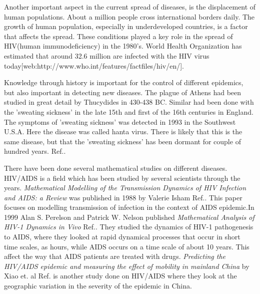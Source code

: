 \documentclass[%
twoside,                 %
final,                   %
chapterprefix=true,      %
open=right               %
10pt]{book}
\begin{document}
\vspace{3mm}




\vspace{3mm}


Another important aspect in the current spread of diseases, is the displacement of human populations. About a million people cross international borders daily. The growth of human population, especially in underdeveloped countries, is a factor that affects the spread. These conditions played a key role in the spread of HIV(human immunodeficiency) in the 1980's. World Health Organization has estimated that around 32.6 million are infected with the HIV virus today[web:http://www.who.int/features/factfiles/hiv/en/].


\vspace{3mm}




\vspace{3mm}


Knowledge through history is important for the control of different epidemics, but also important in detecting new diseases. The plague of Athens had been studied in great detail by Thucydides in 430-438 BC. Similar had been done with the 'sweating sickness' in the late 15th and first of the 16th centuries in England. The symptoms of 'sweating sickness' was detected in 1993 in the Southwest U.S.A. Here the disease was called hanta virus. There is likely that this is the same disease, but that the 'sweating sickness' has been dormant for couple of hundred years. Ref.\cite[p.~317]{murray2002mathematical}.~


\vspace{3mm}




\vspace{3mm}


There have been done several mathematical studies on different diseases. HIV/AIDS is a field which has been studied by several scientists through the years. \emph{Mathematical Modelling of the Transmission Dynamics of HIV Infection and AIDS: a Review} was published in 1988 by Valerie Isham Ref.\cite{isham1988mathematical}. This paper focuses on modelling transmission of infection in the context of AIDS epidemic.In 1999 Alan S. Perelson and Patrick W. Nelson published \emph{Mathematical Analysis of HIV-1 Dynamics in Vivo} Ref.\cite{perelson1999mathematical}. They studied the dynamics of HIV-1 pathogenesis to AIDS, where they looked at rapid dynamical processes that occur in short time scales, as hours, while AIDS occurs on a time scale of about 10 years. This affect the way that AIDS patients are treated with drugs. \emph{Predicting the HIV/AIDS epidemic and measuring the effect of mobility in mainland China} by Xiao et. al Ref.\cite{xiao2013predicting} is another study done on HIV/AIDS where they look at the geographic variation in the severity of the epidemic in China. 
\end{document}
